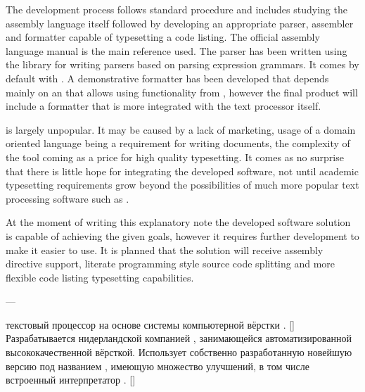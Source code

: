 The development process follows standard procedure and includes studying the
assembly language itself followed by developing an appropriate parser,
assembler and formatter capable of typesetting a code listing. The official
 assembly language manual is the main reference used. The
parser has been written using the  library for writing parsers based
on parsing expression grammars. It comes by default with . A
demonstrative formatter has been developed that depends mainly on an 
that allows using  functionality from , however the
final product will include a formatter that is more integrated with the text
processor itself.

 is largely unpopular. It may be caused by a lack of marketing,
usage of a domain oriented language being a requirement for writing documents,
the complexity of the tool coming as a price for high quality typesetting. It
comes as no surprise that there is little hope for integrating the developed
software, not until academic typesetting requirements grow beyond the
possibilities of much more popular text processing software such as
.

At the moment of writing this explanatory note the developed software solution
is capable of achieving the given goals, however it requires further
development to make it easier to use. It is planned that the solution will
receive assembly directive support, literate programming style source code
splitting and more flexible code listing typesetting capabilities.

\stopexcludedtitle

\stopsectionblock

\startsectionblock[terms]

\startexcludedtitle[
    title={Обозначения и сокращения},
    reference={title: terms},
]

\setupxtable[booktabs][
    bodyfont=,
    columndistance=\spaceamount,
    setups=,
]

\startxtable[booktabs]

\startxtablebody

\startxrow

\startxcell[align=flushright]
\stopxcell

\startxcell[align=center]
---
\stopxcell

\startxcell[align={width, bottom, fullhz, hanging}]
текстовый процессор на основе системы компьютерной вёрстки \corp{\abbr{\TeX}}.
[] Разрабатывается нидерландской компанией , занимающейся автоматизированной высококачественной вёрсткой. Использует
собственно разработанную новейшую версию \corp{\abbr{\TeX}} под названием
, имеющую множество улучшений, в том числе встроенный
интерпретатор . []
\stopxcell

